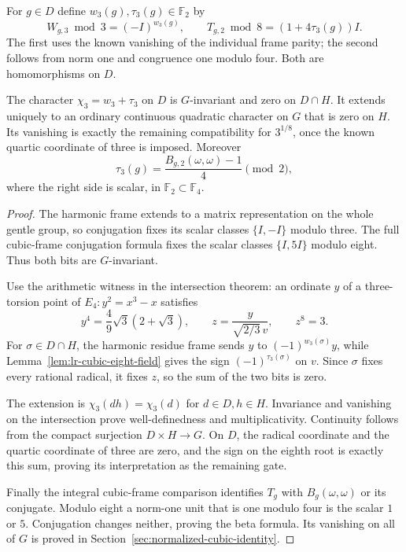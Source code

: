 For $g\in D$ define $w_3(g),\tau_3(g)\in\mathbb F_2$ by
\[
 W_{g,3}\bmod3=(-I)^{w_3(g)},\qquad
 T_{g,2}\bmod8=(1+4\tau_3(g))I.
\]
The first uses the known vanishing of the individual frame
parity; the second follows from norm one and congruence one
modulo four. Both are homomorphisms on $D$.

\begin{proposition}\label{prop:lr-exceptional-three-character}
The character $\chi_3=w_3+\tau_3$ on $D$ is $G$-invariant
and zero on $D\cap H$. It extends uniquely to an ordinary
continuous quadratic character on $G$ that is zero on $H$.
Its vanishing is exactly the remaining compatibility for
$3^{1/8}$, once the known quartic coordinate of three is imposed.
Moreover
\[
 \tau_3(g)=\frac{B_{g,2}(\omega,\omega)-1}{4}\pmod2,
\]
where the right side is scalar, in
$\mathbb F_2\subset\mathbb F_4$.
\end{proposition}
\begin{proof}
The harmonic frame extends to a matrix representation on the
whole gentle group, so conjugation fixes its scalar classes
$\{I,-I\}$ modulo three. The full cubic-frame conjugation
formula fixes the scalar classes $\{I,5I\}$ modulo eight.
Thus both bits are $G$-invariant.

Use the arithmetic witness in the intersection theorem:
an ordinate $y$ of a three-torsion point of
$E_4:y^2=x^3-x$ satisfies
\[
 y^4=\frac49\sqrt3(2+\sqrt3),\qquad
 z=\frac{y}{\sqrt{2/3}\,v},\qquad z^8=3.
\]
For $\sigma\in D\cap H$, the harmonic residue frame sends
$y$ to $(-1)^{w_3(\sigma)}y$, while
Lemma~\ref{lem:lr-cubic-eight-field} gives the sign
$(-1)^{\tau_3(\sigma)}$ on $v$.
Since $\sigma$ fixes every rational radical, it fixes $z$,
so the sum of the two bits is zero.

The extension is $\chi_3(dh)=\chi_3(d)$ for $d\in D,h\in H$.
Invariance and vanishing on the intersection prove
well-definedness and multiplicativity. Continuity follows
from the compact surjection $D\times H\to G$.
On $D$, the radical coordinate and the quartic coordinate of
three are zero, and the sign on the eighth root is exactly
this sum, proving its interpretation as the remaining gate.

Finally the integral cubic-frame comparison identifies $T_g$
with $B_g(\omega,\omega)$ or its conjugate.
Modulo eight a norm-one unit that is one modulo four is
the scalar $1$ or $5$. Conjugation changes neither, proving
the beta formula. Its vanishing on all of $G$ is proved in
Section~\ref{sec:normalized-cubic-identity}.
\end{proof}

